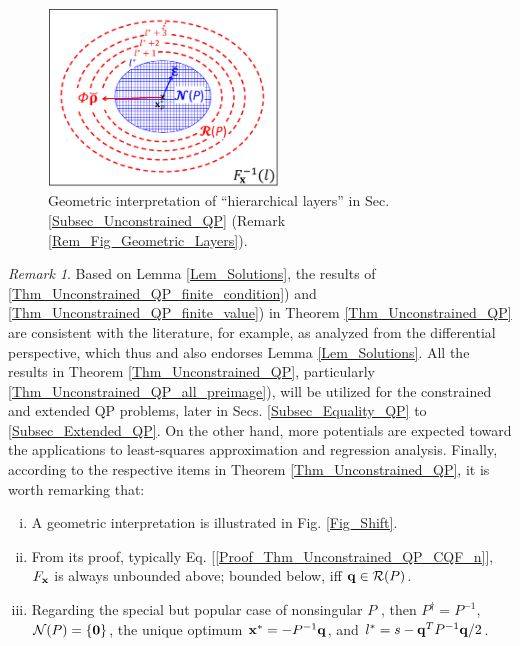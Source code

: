 \documentclass[9pt,twocolumn,twoside,lineno]{pnas-new-1}
\newcommand{\bfx}{{\bf x}}
\newcommand{\bfq}{{\bf q}}
\newcommand{\bfzero}{{\bf 0}}
\newcommand{\calN}{{\mathcal N}}
\newcommand{\calR}{{\mathcal R}}
\theoremstyle{remark}
\newtheorem{remark}{Remark}[section]
\begin{document}
\begin{figure}[htbp]
    \begin{center}
    \includegraphics[width=6.1cm]{Fig_Layers.eps}
    \caption{Geometric interpretation of ``hierarchical layers'' in Sec. {\rm\ref{Subsec_Unconstrained_QP}} (Remark {\rm\ref{Rem_Fig_Geometric_Layers}}).}
    \label{Fig_Layers}
    \end{center}
\end{figure}

\begin{remark}
Based on Lemma \ref{Lem_Solutions}, the results of \ref{Thm_Unconstrained_QP_finite_condition}) and \ref{Thm_Unconstrained_QP_finite_value}) in Theorem \ref{Thm_Unconstrained_QP} are consistent with the literature, for example, \cite{BoVa:04} as analyzed from the differential perspective, which thus and also endorses Lemma \ref{Lem_Solutions}. All the results in Theorem \ref{Thm_Unconstrained_QP}, particularly \ref{Thm_Unconstrained_QP_all_preimage}), will be utilized for the constrained and extended QP problems, later in Secs. \ref{Subsec_Equality_QP} to \ref{Subsec_Extended_QP}. On the other hand, more potentials are expected toward the applications to least-squares approximation and regression analysis. Finally, according to the respective items in Theorem \ref{Thm_Unconstrained_QP}, it is worth remarking that:
\begin{enumerate}[i)]
\item A geometric interpretation is illustrated in Fig. \ref{Fig_Shift}.
\item From its proof, typically Eq. [\ref{Proof_Thm_Unconstrained_QP_CQF_n}], $F_\bfx$ is always unbounded above; bounded below, iff $\bfq\in\calR(P)$.
\item Regarding the special but popular case of nonsingular $P$ \citep{Lu(Ye):03(16)}, then $P^\dagger=P^{-1}$, $\calN(P)=\{\bfzero\}$, the unique optimum $\bfx^*=-P^{-1}\bfq$, and $l^*=s-\bfq^TP^{-1}\bfq/2$.
\end{enumerate}
\label{Rem_Unconstrained_QP}
\end{remark}
\end{document}
